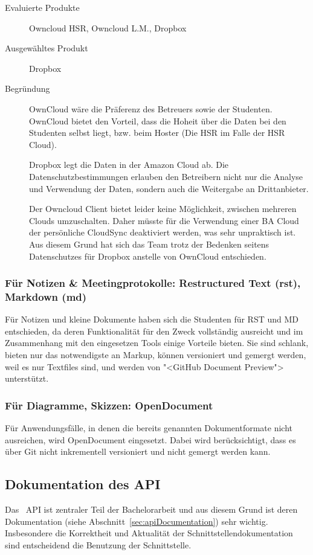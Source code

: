 				\begin{description}
					\item[Evaluierte Produkte] Owncloud HSR, Owncloud L.M., Dropbox
					\item[Ausgewähltes Produkt] Dropbox
					\item[Begründung] OwnCloud wäre die Präferenz des Betreuers sowie der Studenten. 
						OwnCloud bietet den Vorteil, dass die Hoheit über die Daten bei den Studenten selbst liegt, bzw. beim Hoster (Die HSR im Falle der HSR Cloud).
						
						Dropbox legt die Daten in der Amazon Cloud ab. 
						Die Datenschutzbestimmungen erlauben den Betreibern nicht nur die Analyse und Verwendung der Daten, 
						sondern auch die Weitergabe an Drittanbieter.
						
						Der Owncloud Client bietet leider keine Möglichkeit, 
						zwischen mehreren Clouds umzuschalten. 
						Daher müsste für die Verwendung einer BA Cloud der persönliche CloudSync deaktiviert werden, 
						was sehr unpraktisch ist.						
						Aus diesem Grund hat sich das Team trotz der Bedenken seitens Datenschutzes für Dropbox anstelle von OwnCloud entschieden.
				\end{description}

			\subsubsection{Für Notizen \& Meetingprotokolle: Restructured Text (rst), Markdown (md)}
				Für Notizen und kleine Dokumente haben sich die Studenten für RST und MD entschieden, 
				da deren Funktionalität für den Zweck vollständig ausreicht und im Zusammenhang mit den eingesetzen Tools einige Vorteile bieten. 
				Sie sind schlank, bieten nur das notwendigste an Markup, können versioniert und gemergt werden,
				weil es nur Textfiles sind, und werden von "<GitHub Document Preview"> unterstützt.

			\subsubsection{Für Diagramme, Skizzen: OpenDocument}
				Für Anwendungsfälle, in denen die bereits genannten Dokumentformate nicht ausreichen, 
				wird OpenDocument eingesetzt. Dabei wird berücksichtigt, 
				dass es über Git nicht inkrementell versioniert und nicht
				gemergt werden kann.
				
		\subsection{Dokumentation des API}
			Das \eeppi\ API ist zentraler Teil der Bachelorarbeit und aus diesem Grund ist deren Dokumentation (siehe Abschnitt~\ref{sec:apiDocumentation}) sehr wichtig. Insbesondere die Korrektheit und Aktualität der Schnittstellendokumentation sind entscheidend die Benutzung der Schnittstelle.
			
